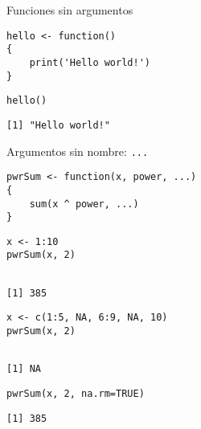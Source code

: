 \documentclass[xcolor={usenames,svgnames,dvipsnames}]{beamer}
\begin{document}
\begin{frame}[label={sec:org0458aec},fragile]{Funciones sin argumentos}
 \lstset{language=r,label= ,caption= ,captionpos=b,numbers=none}
\begin{lstlisting}
hello <- function()
{
    print('Hello world!')
}
\end{lstlisting}

\lstset{language=r,label= ,caption= ,captionpos=b,numbers=none}
\begin{lstlisting}
hello()
\end{lstlisting}

\begin{verbatim}
[1] "Hello world!"
\end{verbatim}
\end{frame}

\begin{frame}[label={sec:orgf53235a},fragile]{Argumentos sin nombre: \texttt{...}}
 \lstset{language=r,label= ,caption= ,captionpos=b,numbers=none}
\begin{lstlisting}
pwrSum <- function(x, power, ...)
{
    sum(x ^ power, ...)
}
\end{lstlisting}

\lstset{language=r,label= ,caption= ,captionpos=b,numbers=none}
\begin{lstlisting}
x <- 1:10
pwrSum(x, 2)
\end{lstlisting}

\begin{verbatim}

[1] 385
\end{verbatim}


\lstset{language=r,label= ,caption= ,captionpos=b,numbers=none}
\begin{lstlisting}
x <- c(1:5, NA, 6:9, NA, 10)
pwrSum(x, 2)
\end{lstlisting}

\begin{verbatim}

[1] NA
\end{verbatim}


\lstset{language=r,label= ,caption= ,captionpos=b,numbers=none}
\begin{lstlisting}
pwrSum(x, 2, na.rm=TRUE)
\end{lstlisting}

\begin{verbatim}
[1] 385
\end{verbatim}
\end{frame}
\end{document}
